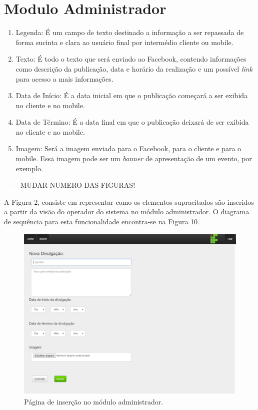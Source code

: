 \section{Modulo Administrador}
 \begin{enumerate}
   \item Legenda: É um campo de texto destinado a informação a ser repassada de forma sucinta e clara ao usuário final por intermédio cliente ou mobile. 
   \item Texto: É todo o texto que será enviado ao Facebook, contendo informações como descrição da publicação, data e horário da realização e um possível \textit{link} para acesso a mais informações. 
   \item Data de Início: É a data inicial em que o publicação começará a ser exibida no cliente e no mobile.
   \item Data de Término: É a data final em que o publicação deixará de ser exibida no cliente e no mobile.
   \item Imagem: Será a imagem enviada para o Facebook, para o cliente e para o mobile. Essa imagem pode ser um \textit{banner} de apresentação de um evento, por exemplo.
 \end{enumerate}
 
 ------ MUDAR NUMERO DAS FIGURAS!
 
 A Figura 2, consiste em representar como os elementos supracitados são inseridos a partir da visão do operador do sistema no módulo administrador. O diagrama de sequência para esta funcionalidade encontra-se na Figura 10.

 
 \begin{figure}[!htb]
\centering
\includegraphics[scale=0.6]{figuras/administrador1}
\caption{Página de inserção no módulo administrador.}
\label{Rotulo}
\end{figure}

